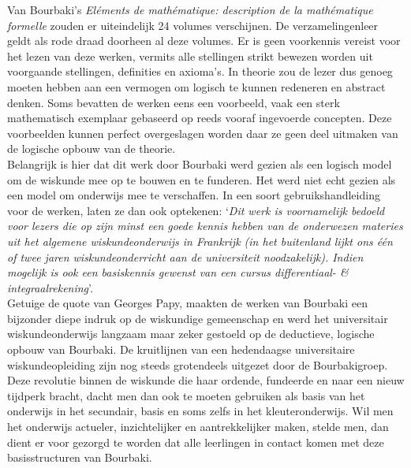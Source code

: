\documentclass[a4paper,11pt]{article}
\begin{document}
\noindent Van Bourbaki's \textit{Eléments de mathématique: description de la mathématique formelle} 
zouden er uiteindelijk 24 volumes verschijnen. De verzamelingenleer geldt als 
rode draad doorheen al deze volumes. Er is geen voorkennis vereist voor het lezen 
van deze werken, vermits alle stellingen strikt bewezen worden uit voorgaande 
stellingen, definities en axioma's. In theorie zou de lezer dus genoeg moeten hebben aan 
een vermogen om logisch te kunnen redeneren en abstract denken. Soms bevatten de
werken eens een voorbeeld, vaak een sterk mathematisch exemplaar gebaseerd op 
reeds vooraf ingevoerde concepten. Deze voorbeelden kunnen perfect overgeslagen 
worden daar ze geen deel uitmaken van de logische opbouw van de theorie.\\

\noindent Belangrijk is hier dat dit werk door Bourbaki werd gezien als een 
logisch model om de wiskunde mee op te bouwen en te funderen. Het werd niet echt 
gezien als een model om onderwijs mee te verschaffen. In een soort 
gebruikshandleiding voor de werken, laten ze dan ook optekenen: `\textit{Dit werk is 
voornamelijk bedoeld voor lezers die op zijn minst een goede kennis hebben van 
de onderwezen materies uit het algemene wiskundeonderwijs in Frankrijk (in het buitenland 
lijkt ons één of twee jaren wiskundeonderricht aan de universiteit 
noodzakelijk). Indien mogelijk is ook een basiskennis gewenst van een cursus 
differentiaal- \& integraalrekening}'.\\

\noindent Getuige de quote van Georges Papy, maakten de werken van Bourbaki een bijzonder
diepe indruk op de wiskundige gemeenschap en werd het universitair 
wiskundeonderwijs langzaam maar zeker gestoeld op de deductieve, logische opbouw van Bourbaki.
De kruitlijnen van een hedendaagse universitaire wiskundeopleiding zijn nog 
steeds grotendeels uitgezet door de Bourbakigroep. Deze revolutie binnen 
de wiskunde die haar ordende, fundeerde en naar een nieuw tijdperk 
bracht, dacht men dan ook te moeten gebruiken als basis van het onderwijs in het 
secundair, basis en soms zelfs in het kleuteronderwijs. Wil men het onderwijs 
actueler, inzichtelijker en aantrekkelijker maken, stelde men, dan dient er voor 
gezorgd te worden dat alle leerlingen in contact komen met deze basisstructuren 
van Bourbaki.\\
\end{document}
